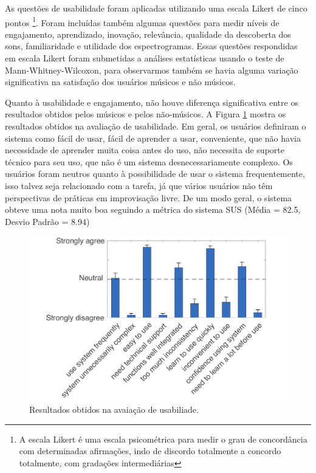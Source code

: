 As questões de usabilidade foram aplicadas utilizando uma escala Likert de cinco pontos \footnote{A escala Likert é uma escala psicométrica para medir o grau de concordância com determinadas afirmações, indo de discordo totalmente a concordo totalmente, com gradações intermediárias}. Foram incluídas também algumas questões para medir níveis de engajamento, aprendizado, inovação, relevância, qualidade da descoberta dos sons, familiaridade e utilidade dos espectrogramas. Essas questões respondidas em escala Likert foram submetidas a análises estatísticas usando o teste de Mann-Whitney-Wilcoxon, para observarmos também se havia alguma variação significativa na satisfação dos usuários músicos e não músicos.

Quanto à usabilidade e engajamento, não houve diferença significativa entre os resultados obtidos pelos músicos e pelos não-músicos. A Figura \ref{fig:SUS} mostra os resultados obtidos na avaliação de usabilidade. Em geral, os usuários definiram o sistema como fácil de usar, fácil de aprender a usar, conveniente, que não havia necessidade de aprender muita coisa antes do uso, não necessita de suporte técnico para seu uso, que não é um sistema desnecessariamente complexo. Os usuários foram neutros quanto à possibilidade de usar o sistema frequentemente, isso talvez seja relacionado com a tarefa, já que vários usuários não têm perspectivas de práticas em improvisação livre. De um modo geral, o sistema obteve uma nota muito boa seguindo a métrica do sistema SUS (Média = 82.5, Desvio Padrão = 8.94)

\begin{figure}

\includegraphics[width=1\textwidth]{pictures/cap4/SUS_lower}
\caption{Resultados obtidos na avaiação de usabiliade.}
\label{fig:SUS}
\end{figure}

